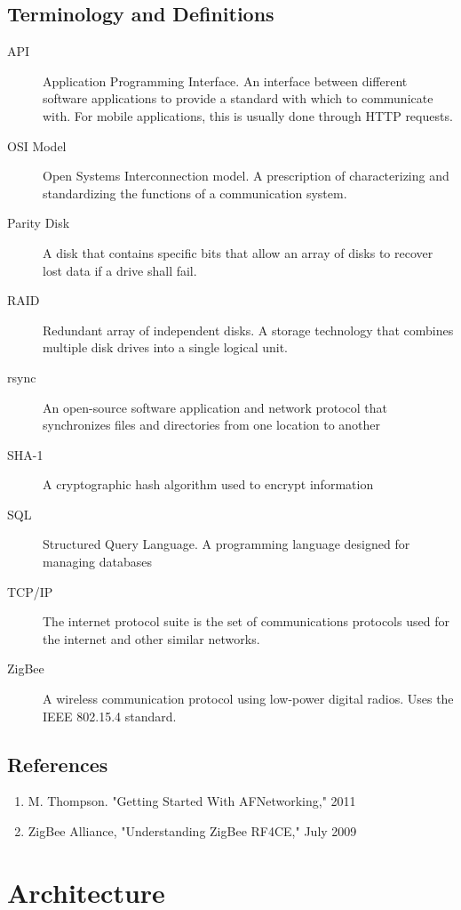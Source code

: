 \documentclass{report}
\begin{document}
\section{Terminology and Definitions}
\begin{description}
\item[API] Application Programming Interface. An interface between different
software applications to provide a standard with which to communicate with. For
mobile applications, this is usually done through HTTP requests.
\item[OSI Model] Open Systems Interconnection model. A prescription of characterizing
and standardizing the functions of a communication system.
\item[Parity Disk] A disk that contains specific bits that allow an array of disks to recover
lost data if a drive shall fail.
\item[RAID] Redundant array of independent disks. A storage technology that
combines multiple disk drives into a single logical unit.
\item[rsync] An open-source software application and network protocol that synchronizes
files and directories from one location to another
\item[SHA-1] A cryptographic hash algorithm used to encrypt information
\item[SQL] Structured Query Language. A programming language designed for managing
databases
\item[TCP/IP] The internet protocol suite is the set of communications protocols used
for the internet and other similar networks.
\item[ZigBee] A wireless communication protocol using low-power digital radios.
Uses the IEEE 802.15.4 standard.
\end{description}

\section{References}

\begin{enumerate}
    \item M. Thompson. "Getting Started With AFNetworking," 2011
    \item ZigBee Alliance, "Understanding ZigBee RF4CE," July 2009
\end{enumerate}
%

\chapter{Architecture} %
\label{ch:architecture}
\end{document}
